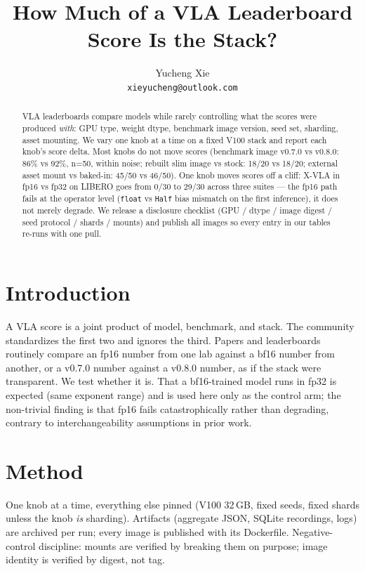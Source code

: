 \documentclass{article}
\title{How Much of a VLA Leaderboard Score Is the Stack?}
\author{
  Yucheng Xie \\
  \texttt{xieyucheng@outlook.com}
}
\begin{document}
\maketitle

\begin{abstract}
VLA leaderboards compare models while rarely controlling what the scores
were produced \emph{with}: GPU type, weight dtype, benchmark image version,
seed set, sharding, asset mounting. We vary one knob at a time on a fixed
V100 stack and report each knob's score delta. Most knobs do not move scores
(benchmark image v0.7.0 vs v0.8.0: 86\% vs 92\%, n=50, within noise; rebuilt
slim image vs stock: 18/20 vs 18/20; external asset mount vs baked-in: 45/50
vs 46/50). One knob moves scores off a cliff: X-VLA in fp16 vs fp32 on
LIBERO goes from 0/30 to 29/30 across three suites --- the fp16 path fails
at the operator level (\texttt{float} vs \texttt{Half} bias mismatch on the
first inference), it does not merely degrade. We release a disclosure
checklist (GPU / dtype / image digest / seed protocol / shards / mounts) and
publish all images so every entry in our tables re-runs with one pull.
\end{abstract}

\section{Introduction}
A VLA score is a joint product of model, benchmark, and stack. The community
standardizes the first two and ignores the third. Papers and leaderboards
routinely compare an fp16 number from one lab against a bf16 number from
another, or a v0.7.0 number against a v0.8.0 number, as if the stack were
transparent. We test whether it is. That a bf16-trained model runs in fp32 is
expected (same exponent range) and is used here only as the control arm; the
non-trivial finding is that fp16 fails catastrophically rather than
degrading, contrary to interchangeability assumptions in prior work.

\section{Method}
One knob at a time, everything else pinned (V100 32\,GB, fixed seeds, fixed
shards unless the knob \emph{is} sharding). Artifacts (aggregate JSON,
SQLite recordings, logs) are archived per run; every image is published with
its Dockerfile. Negative-control discipline: mounts are verified by breaking
them on purpose; image identity is verified by digest, not tag.
\end{document}
